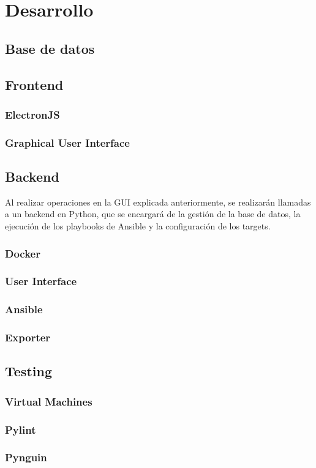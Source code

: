 \chapter{Desarrollo}
\label{ch:desarrollo}

\section{Base de datos}


\newpage
\section{Frontend}
\subsection{ElectronJS}


\subsection[GUI]{Graphical User Interface}


\newpage
\section{Backend}
Al realizar operaciones en la GUI explicada anteriormente, se realizarán llamadas a un backend en Python, que se encargará de la gestión de la base de datos, la ejecución de los playbooks de Ansible y la configuración de los targets.
\subsection{Docker}


\subsection{User Interface}


\subsection{Ansible}


\subsection{Exporter}


\newpage
\section{Testing}
\subsection{Virtual Machines}


\subsection{Pylint}


\subsection{Pynguin}
